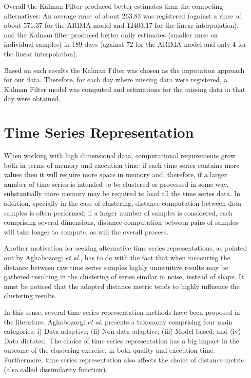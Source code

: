 \documentclass[9pt,journal,compsoc]{IEEEtran}
\begin{document}
Overall the Kalman Filter produced better estimates than the competing alternatives: An average rmse of about $263.83$ was registered (against a rmse of about $571.37$ for the ARIMA model and $12403.17$ for the linear interpolation), and the Kalman filter produced better daily estimates (smaller rmse on individual samples) in 189 days (against 72 for the ARIMA model and only 4 for the linear interpolation).

Based on such results the Kalman Filter was chosen as the imputation approach for our data. Therefore, for each day where missing data were registered, a Kalman Filter model was computed and estimations for the missing data in that day were obtained.

\section{Time Series Representation}
\label{time_series_representation}

When working with high dimensional data, computational requirements grow both in terms of memory and execution time: if each time series contains more values then it will require more space in memory and, therefore, if a larger number of time series is intended to be clustered or processed in some way, substantially more memory may be required to load all the time series data. In addition, specially in the case of clustering, distance computation between data samples is often performed; if a larger number of samples is considered, each comprising several dimensions, distance computation between pairs of samples will take longer to compute, as will the overall process.

Another motivation for seeking alternative time series representations, as pointed out by Aghabozorgi \emph{et al.}\cite{aghabozorgi2015time}, has to do with the fact that when measuring the distance between raw time series samples highly unintuitive results may be gathered resulting in the clustering of series similar in noise, instead of shape. It must be noticed that the adopted distance metric tends to highly influence the clustering results.

In this sense, several time series representation methods have been proposed in the literature. Aghabozorgi \emph{et al.} presents a taxonomy comprising four main categories: i) Data adaptive; (ii) Non-data adaptive; (iii) Model-based; and (iv) Data dictated. The choice of time series representation has a big impact in the outcome of the clustering exercise, in both quality and execution time. Furthermore, time series representation also affects the choice of distance metric (also called dissimilarity function).
\end{document}
